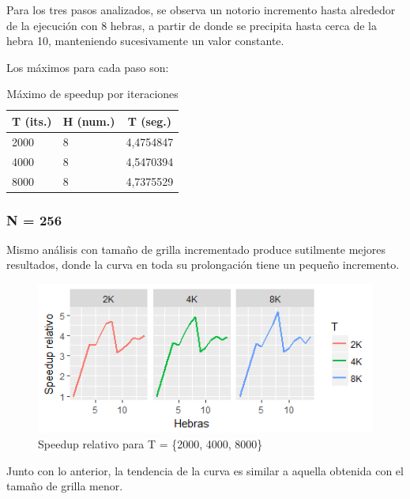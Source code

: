 \documentclass[jou]{apa6}
\begin{document}
Para los tres pasos analizados, se observa un notorio incremento hasta alrededor de la ejecución con 8 hebras, a partir de donde se precipita hasta cerca de la hebra 10, manteniendo sucesivamente un valor constante.

Los máximos para cada paso son:

\begin{table}[h]
\centering
\caption{Máximo de speedup por iteraciones}
\label{my-label}
\begin{tabular}{@{}lll@{}}
\toprule
\multicolumn{1}{c}{T (its.)} & \multicolumn{1}{c}{H (num.)} & \multicolumn{1}{c}{T (seg.)} \\ \midrule
2000                         & 8                            & 4,4754847                    \\
4000                         & 8                            & 4,5470394                    \\
8000                         & 8                            & 4,7375529                    \\ \bottomrule
\end{tabular}
\end{table}

\clearpage

\subsubsection{N = 256}
Mismo análisis con tamaño de grilla incrementado produce sutilmente mejores resultados, donde la curva en toda su prolongación tiene un pequeño incremento.

\begin{figure}[h]
	\includegraphics[width=\columnwidth]{srel-256px.png}
	\caption{Speedup relativo para T = \{2000, 4000, 8000\}}
	\label{fig:Figure4}
\end{figure}

Junto con lo anterior, la tendencia de la curva es similar a aquella obtenida con el tamaño de grilla menor.
\end{document}
